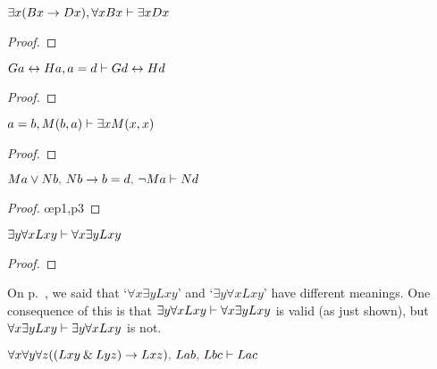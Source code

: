 \begin{earg}
\noindent\begin{minipage}{0.99\textwidth}
\item $\exists x(Bx \rightarrow Dx), \forall xBx \vdash \exists xDx$

\begin{proof}
	 \pr{}
	 \pr{}
	\open
		 \as{}
		 
		 
		 
	\close
	 
\end{proof}
\bigskip
\end{minipage}

\item $Ga \leftrightarrow Ha, a=d \vdash Gd \leftrightarrow Hd$

\begin{proof}
	 \pr{}
	 \pr{}
	 
\end{proof}
\bigskip

\noindent\begin{minipage}{0.99\textwidth}
\item $a=b, M(b,a) \vdash \exists xM(x,x)$

\begin{proof}
	 \pr{}
	 \pr{}
	 
	 
\end{proof}
\smallskip
\end{minipage}

\item $Ma \vee Nb\textcolor{magenta}{,}~ Nb \rightarrow b=d\textcolor{magenta}{,}~ {\neg} Ma  \vdash Nd$

\begin{proof}
	 \pr{}
	 \pr{}
	 \pr{}
	 \oe{p1,p3}
	 
	 
\end{proof}
\medskip

\item $\exists y \forall xLxy \vdash \forall x \exists yLxy$

\begin{proof}
	 \pr{}
	\open
		 \as{}
		 
		 
		 
	\close
	 
\end{proof}
\smallskip
On p.~\pageref{quantifier-order}, we said that `$\forall x \exists yLxy$' and `$\exists y \forall xLxy$' have different meanings. One consequence of this is that $\exists y \forall xLxy \vdash \forall x \exists yLxy$ is valid (as just shown), but $\forall x \exists yLxy \vdash \exists y \forall xLxy$ is not. \medskip


\item $\forall x \forall y \forall z((Lxy \mathbin{\&} Lyz) \rightarrow Lxz)\textcolor{magenta}{,}~ Lab\textcolor{magenta}{,}~ Lbc \vdash Lac$
\end{earg}  %

